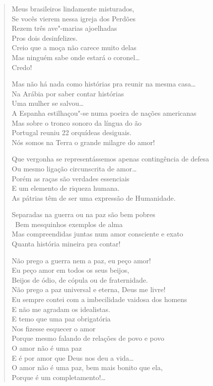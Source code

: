 {\begin{verse}
Meus brasileiros lindamente misturados,\\
Se vocês vierem nessa igreja dos Perdões\\
Rezem três ave"-marias ajoelhadas\\
Pros dois desinfelizes.\\
Creio que a moça não carece muito delas\\
Mas ninguém sabe onde estará o coronel\ldots{}\\
Credo!

Mas não há nada como histórias pra reunir na mesma casa\ldots{}\\
Na Arábia por saber contar histórias\\
Uma mulher se salvou\ldots{}\\
A Espanha estilhaçou"-se numa poeira de nações americanas\\
Mas sobre o tronco sonoro da língua do ão\\
Portugal reuniu 22 orquídeas desiguais.\\
Nós somos na Terra o grande milagre do amor!

Que vergonha se representássemos apenas contingência de defesa\\
Ou mesmo ligação circunscrita de amor\ldots{}\\
Porém as raças são verdades essenciais\\
E um elemento de riqueza humana.\\
As pátrias têm de ser uma expressão de Humanidade.

Separadas na guerra ou na paz são bem pobres\\\
Bem mesquinhos exemplos de alma\\
Mas compreendidas juntas num amor consciente e exato\\
Quanta história mineira pra contar!

Não prego a guerra nem a paz, eu peço amor!\\
Eu peço amor em todos os seus beijos,\\
Beijos de ódio, de cópula ou de fraternidade.\\
Não prego a paz universal e eterna, Deus me livre!\\
Eu sempre contei com a imbecilidade vaidosa dos homens\\
E não me agradam os idealistas.\\
E temo que uma paz obrigatória\\
Nos fizesse esquecer o amor\\
Porque mesmo falando de relações de povo e povo\\
O amor não é uma paz\\
E é por amor que Deus nos deu a vida\ldots{}\\
O amor não é uma paz, bem mais bonito que ela,\\
Porque é um completamento!\ldots{}


\end{verse}}
